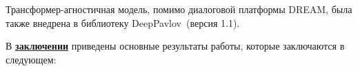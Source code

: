 Трансформер-агностичная модель, помимо диалоговой платформы DREAM, была также внедрена в библиотеку DeepPavlov~\cite{dp_2023}(версия 1.1).


В \underline{\textbf{заключении}} приведены основные результаты работы, которые заключаются в следующем:


